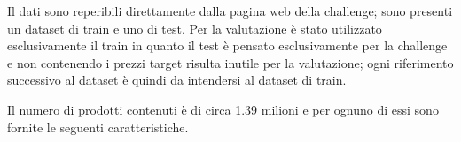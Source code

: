 
Il dati sono reperibili direttamente dalla pagina web della challenge; sono
presenti un dataset di train e uno di test. Per la valutazione è stato utilizzato
esclusivamente il train in quanto il test è pensato esclusivamente per la
challenge e non contenendo i prezzi target risulta inutile per la valutazione;
ogni riferimento successivo al dataset è quindi da intendersi al dataset di train.

Il numero di prodotti contenuti è di circa 1.39 milioni e per ognuno di essi
sono fornite le seguenti caratteristiche.


